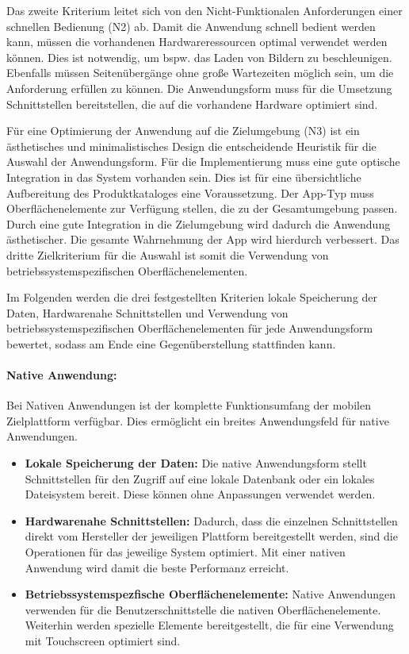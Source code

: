 Das zweite Kriterium leitet sich von den Nicht-Funktionalen Anforderungen einer schnellen Bedienung (N2) ab. Damit die Anwendung schnell bedient werden kann, müssen die vorhandenen Hardwareressourcen optimal verwendet werden können. Dies ist notwendig, um bspw. das Laden von Bildern zu beschleunigen. Ebenfalls müssen Seitenübergänge ohne große Wartezeiten möglich sein, um die Anforderung erfüllen zu können. Die Anwendungsform muss für die Umsetzung Schnittstellen bereitstellen, die auf die vorhandene Hardware optimiert sind.

Für eine Optimierung der Anwendung auf die Zielumgebung (N3) ist ein ästhetisches und minimalistisches Design die entscheidende Heuristik für die Auswahl der Anwendungsform. Für die Implementierung muss eine gute optische Integration in das System vorhanden sein. Dies ist für eine übersichtliche Aufbereitung des Produktkataloges eine Voraussetzung. Der App-Typ muss Oberflächenelemente zur Verfügung stellen, die zu der Gesamtumgebung passen. Durch eine gute Integration in die Zielumgebung wird dadurch die Anwendung ästhetischer. Die gesamte Wahrnehmung der App wird hierdurch verbessert. Das dritte Zielkriterium für die Auswahl ist somit die Verwendung von betriebssystemspezifischen Oberflächenelementen.    

Im Folgenden werden die drei festgestellten Kriterien lokale Speicherung der Daten, Hardwarenahe Schnittstellen und Verwendung von betriebssystemspezifischen Oberflächenelementen  für jede Anwendungsform bewertet, sodass am Ende eine Gegenüberstellung stattfinden kann.

\paragraph{Native Anwendung: }Bei Nativen Anwendungen ist der komplette Funktionsumfang der mobilen Zielplattform verfügbar. Dies ermöglicht ein breites Anwendungsfeld für native Anwendungen.
\begin{itemize}
\item \textbf{Lokale Speicherung der Daten:} Die native Anwendungsform stellt Schnittstellen für den Zugriff auf eine lokale Datenbank oder ein lokales Dateisystem bereit. Diese können ohne Anpassungen verwendet werden.

\item \textbf{Hardwarenahe Schnittstellen:} Dadurch, dass die einzelnen Schnittstellen direkt vom Hersteller der jeweiligen Plattform bereitgestellt werden, sind die Operationen für das jeweilige System optimiert. Mit einer nativen Anwendung wird damit die beste Performanz erreicht. 

\item \textbf{Betriebssystemspezfische Oberflächenelemente:} Native Anwendungen verwenden für die Benutzerschnittstelle die nativen Oberflächenelemente. Weiterhin werden spezielle Elemente bereitgestellt, die für eine Verwendung mit Touchscreen optimiert sind. 
\end{itemize}

